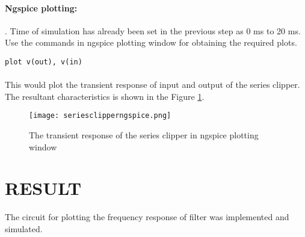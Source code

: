 \paragraph{Ngspice plotting:}. Time of simulation has already been set in the previous step as 0 ms to 20 ms. Use the commands in ngspice plotting window for obtaining the required plots.

\texttt{plot v(out), v(in) }

\paragraph{}

This would plot the transient response of input and output of the series clipper. The resultant characteristics is shown in the Figure \ref{seriesclipperngspice}. 

\begin{figure}[h]
\centering
\texttt{[image: seriesclipperngspice.png]}
\caption{The transient response of the series clipper in ngspice plotting window}
\label{seriesclipperngspice}
\end{figure}



\section*{RESULT}
The circuit for plotting the frequency response of filter was implemented and simulated.


